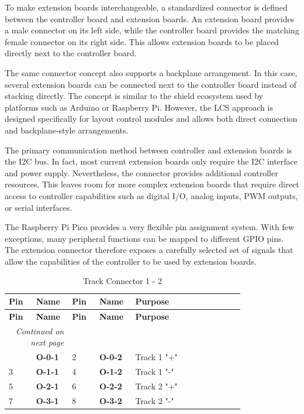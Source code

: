 
To make extension boards interchangeable, a standardized connector is defined between the controller 
board and extension boards.
An extension board provides a male connector on its left side, while the controller board provides 
the matching female connector on its right side. This allows extension boards to be placed directly 
next to the controller board.

The same connector concept also supports a backplane arrangement. In this case, several extension 
boards can be connected next to the controller board instead of stacking directly.
The concept is similar to the shield ecosystem used by platforms such as Arduino or Raspberry Pi. 
However, the LCS approach is designed specifically for layout control modules and allows both direct 
connection and backplane-style arrangements.

The primary communication method between controller and extension boards is the I2C bus. In fact, 
most current extension boards only require the I2C interface and power supply.
Nevertheless, the connector provides additional controller resources. This leaves room for more 
complex extension boards that require direct access to controller capabilities such as digital I/O, 
analog inputs, PWM outputs, or serial interfaces.

The Raspberry Pi Pico provides a very flexible pin assignment system. With few exceptions, 
many peripheral functions can be mapped to different GPIO pins. 
The extension connector therefore exposes a carefully selected set 
of signals that allow the capabilities of the controller to be used by extension boards.

\begin{longtable}{@{}|p{0.1\linewidth}|p{0.1\linewidth}|p{0.1\linewidth}|p{0.1\linewidth}|p{0.4\linewidth}|@{}}
    \caption{Track Connector 1 - 2} \\
    \toprule
    \textbf{Pin} & \textbf{Name} & \textbf{Pin} & \textbf{Name} & \textbf{Purpose} \\
    \midrule
    \endfirsthead
    \toprule
    \textbf{Pin} & \textbf{Name} & \textbf{Pin} & \textbf{Name} & \textbf{Purpose} \\
    \midrule
    \endhead
    \midrule
    \multicolumn{2}{r}{\textit{Continued on next page}} \\
    \midrule
    \endfoot
    \bottomrule
    \endlastfoot
    1 & \textbf{O-0-1} & 2 & \textbf{O-0-2} & Track 1 "+"\\
    \midrule
    3 & \textbf{O-1-1} & 4 & \textbf{O-1-2} & Track 1 "-"\\
    \midrule
    5 & \textbf{O-2-1} & 6 & \textbf{O-2-2} & Track 2 "+"\\
    \midrule
    7 & \textbf{O-3-1} & 8 & \textbf{O-3-2} & Track 2 "-"\\
    \midrule
    \end{longtable}  

